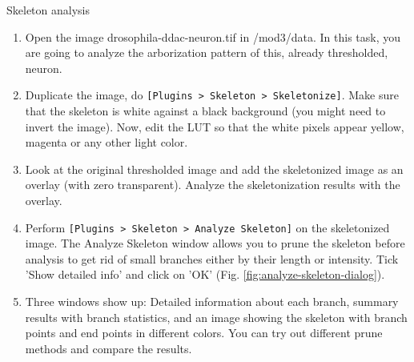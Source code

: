 \begin{taskbox}{Skeleton analysis}
\begin{enumerate}
	\item Open the image drosophila-ddac-neuron.tif in /mod3/data. In this task, you are going to analyze the arborization pattern of this, already thresholded, neuron. 
	\item Duplicate the image, do \texttt{[Plugins > Skeleton > Skeletonize]}. Make sure that the skeleton is white against a black background (you might need to invert the image). Now, edit the LUT so that the white pixels appear yellow, magenta or any other light color.
	\item Look at the original thresholded image and add the skeletonized image as an overlay (with zero transparent). Analyze the skeletonization results with the overlay.
	\item Perform \texttt{[Plugins > Skeleton > Analyze Skeleton]} on the skeletonized image. The Analyze Skeleton window allows you to prune the skeleton before analysis to get rid of small branches either by their length or intensity. Tick 'Show detailed info' and click on 'OK' (Fig. \ref{fig:analyze-skeleton-dialog}).
	
	\begin{minipage}[t]{\linewidth}
		\begin{center}
		\medskip
		\label{fig:analyze-skeleton-dialog}
		\end{center}
	\end{minipage}
	
	\item Three windows show up: Detailed information about each branch, summary results with branch statistics, and an image showing the skeleton with branch points and end points in different colors. You can try out different prune methods and compare the results. 
	
	\end{enumerate}
\end{taskbox}

